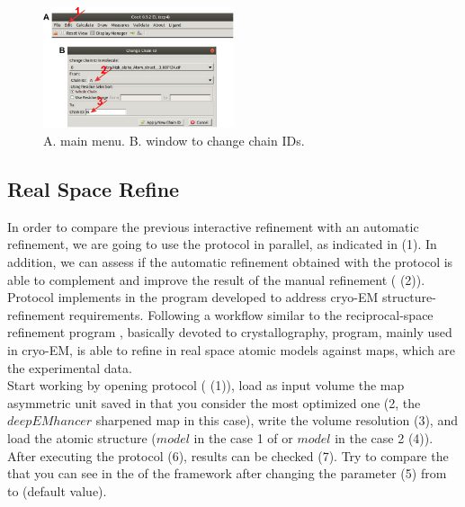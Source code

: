  \begin{figure}[H]
  \centering 
  \captionsetup{width=.9\linewidth} 
  \includegraphics[width=0.5\textwidth]{Images/Fig74}
  \caption{A. \coot main menu. B. \coot window to change chain IDs.}
  \label{fig:chimerax_asymm_unit_2}
  \end{figure}
 
 
 \subsection*{\phenix Real Space Refine}
 
 In order to compare the previous \coot interactive refinement with an automatic refinement, we are going to use the
  protocol in parallel, as indicated in  (1). In addition, we can assess if the automatic refinement obtained with the protocol  is able to complement and improve the result of the \coot manual refinement ( (2)). Protocol  implements in \scipion the  program developed to address cryo-EM structure-refinement requirements. Following a workflow similar to the \phenix reciprocal-space refinement program , basically devoted to crystallography,  program, mainly used in cryo-EM, is able to refine in real space atomic models against maps, which are the experimental data.\\
 
 Start working by opening  protocol ( (1)), load as input volume the map asymmetric unit saved in \coot that you consider the most optimized one (2, the $deepEMhancer$ sharpened map in this case), write the volume resolution (3), and load the atomic structure ($model$   in the case 1 of  or $model$  in the case 2 (4)). After executing the protocol (6), results can be checked (7). Try to compare the 
that you can see in the  of the \scipion framework after changing the  parameter  (5) from  to  (default value). 

